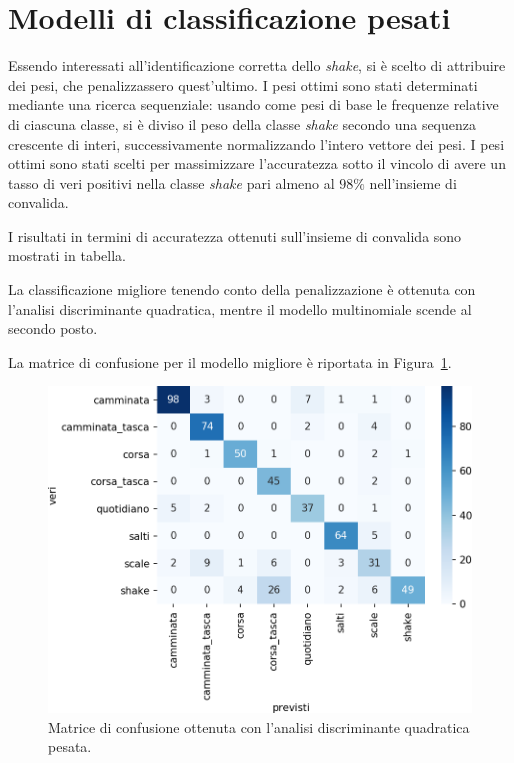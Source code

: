 \documentclass[main.tex]{subfiles}
\begin{document}
\section{Modelli di classificazione pesati}

Essendo interessati all\rq{}identificazione corretta dello {\em shake}, si è scelto di attribuire dei pesi, che penalizzassero quest\rq{}ultimo. I pesi ottimi sono stati determinati mediante una ricerca sequenziale: usando come pesi di base le frequenze relative di ciascuna classe, si è diviso il peso della classe {\em shake} secondo una sequenza crescente di interi, successivamente normalizzando l'intero vettore dei pesi. I pesi ottimi sono stati scelti per massimizzare l\rq{}accuratezza sotto il vincolo di avere un tasso di veri positivi nella classe {\em shake} pari almeno al $98\%$ nell\rq{}insieme di convalida.

I risultati in termini di accuratezza ottenuti sull\rq{}insieme di convalida sono mostrati in tabella.


La classificazione migliore tenendo conto della penalizzazione è ottenuta con l\rq{}analisi discriminante quadratica, mentre il modello multinomiale scende al secondo posto.

La matrice di confusione per il modello migliore è riportata in Figura~\ref{fig:qda_pen}.
\begin{figure}[H]
	\centering
	\includegraphics[width=\confusion]{../../figure/confusionMatrix-QDA-penalizzata.png}
	\caption{Matrice di confusione ottenuta con l'analisi discriminante quadratica pesata.}
	\label{fig:qda_pen}
\end{figure}
\end{document}

